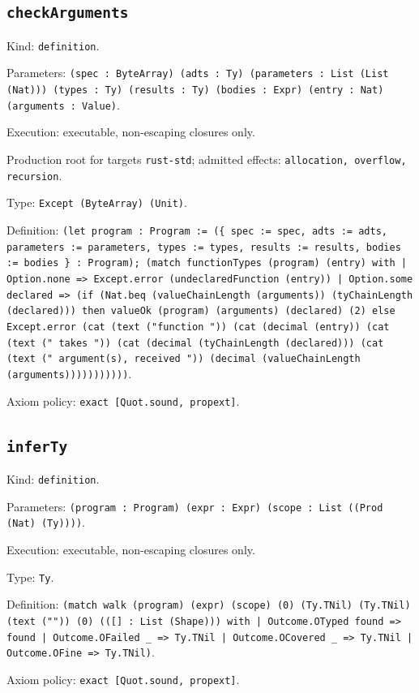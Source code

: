 \documentclass[11pt]{article}
\begin{document}
\subsection*{\texttt{checkArguments}}
\noindent Kind: \texttt{definition}.\par
\noindent Parameters: \texttt{(spec : ByteArray) (adts : Ty) (parameters : List (List (Nat))) (types : Ty) (results : Ty) (bodies : Expr) (entry : Nat) (arguments : Value)}.\par
\noindent Execution: executable, non-escaping closures only.\par
\noindent Production root for targets \texttt{rust-std}; admitted effects: \texttt{allocation, overflow, recursion}.\par
\noindent Type: \texttt{Except (ByteArray) (Unit)}.\par
\noindent Definition: \texttt{(let program : Program := (\{ spec := spec, adts := adts, parameters := parameters, types := types, results := results, bodies := bodies \} : Program); (match functionTypes (program) (entry) with | Option.none => Except.error (undeclaredFunction (entry)) | Option.some declared => (if (Nat.beq (valueChainLength (arguments)) (tyChainLength (declared))) then valueOk (program) (arguments) (declared) (2) else Except.error (cat (text ("function ")) (cat (decimal (entry)) (cat (text (" takes ")) (cat (decimal (tyChainLength (declared))) (cat (text (" argument(s), received ")) (decimal (valueChainLength (arguments)))))))))))}.\par
\noindent Axiom policy: \texttt{exact [Quot.sound, propext]}.\par
\subsection*{\texttt{inferTy}}
\noindent Kind: \texttt{definition}.\par
\noindent Parameters: \texttt{(program : Program) (expr : Expr) (scope : List ((Prod (Nat) (Ty))))}.\par
\noindent Execution: executable, non-escaping closures only.\par
\noindent Type: \texttt{Ty}.\par
\noindent Definition: \texttt{(match walk (program) (expr) (scope) (0) (Ty.TNil) (Ty.TNil) (text ("")) (0) (([] : List (Shape))) with | Outcome.OTyped found => found | Outcome.OFailed \_ => Ty.TNil | Outcome.OCovered \_ => Ty.TNil | Outcome.OFine => Ty.TNil)}.\par
\noindent Axiom policy: \texttt{exact [Quot.sound, propext]}.\par
\end{document}
